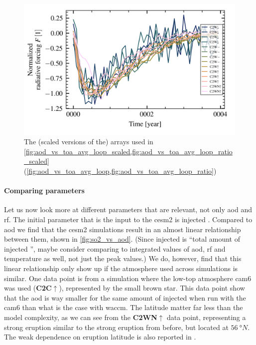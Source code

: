 \documentclass[twocol]{ametsocV5}
\newcommand{\iso}[1][i]{{#1}njected \ce{SO2}}
\begin{document}
\begin{figure}
  \begin{center}
    \includegraphics[width=0.95\linewidth]{figures/toa_arrays_normalized.png}
  \end{center}
  \caption{
    The (scaled versions of the) arrays used in
    \cref{fig:aod_vs_toa_avg_loop_scaled,fig:aod_vs_toa_avg_loop_ratio_scaled}
    (\cref{fig:aod_vs_toa_avg_loop,fig:aod_vs_toa_avg_loop_ratio})
  }%
  \label{fig:toa_arrays_normalized}
\end{figure}

\paragraph{Comparing parameters}

Let us now look more at different parameters that are relevant, not only \acrshort{aod}
and \acrshort{rf}. The initial parameter that is the input to the \acrshort{cesm2} is
injected . Compared to \acrshort{aod} we find that the \acrshort{cesm2}
simulations result in an almost linear relationship between them, shown in
\cref{fig:so2_vs_aod}. (Since \iso{} is ``total amount of \iso{}'', maybe consider
comparing to integrated values of \acrshort{aod}, \acrshort{rf} and temperature as well,
not just the peak values.) We do, however, find that this linear relationship only show
up if the atmosphere used across simulations is similar. One data point is from a
simulation where the low-top atmosphere \acrshort{cam6} was used
(\textbf{C2C\(\uparrow\)}), represented by the small brown star. This data point show
that the \acrshort{aod} is way smaller for the same amount of injected  when run
with the \acrshort{cam6} than what is the case with \acrshort{waccm}. The latitude
matter far less than the model complexity, as we can see from the
\textbf{C2WN\(\uparrow\)} data point, representing a strong eruption similar to the
strong eruption from before, but located at \( \SI{56}{\degree N} \). The weak
dependence on eruption latitude is also reported in \citet{marshall2019}.
\end{document}
